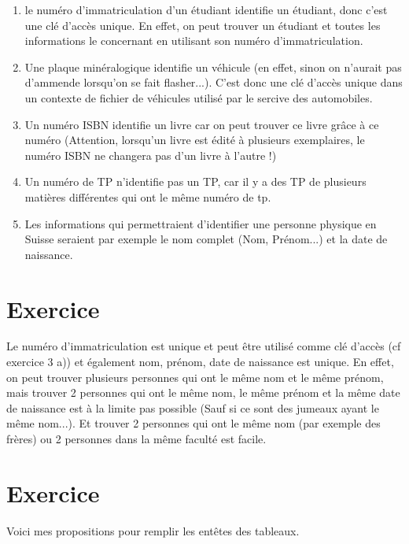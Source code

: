 \documentclass{article}
\begin{document}
\begin{enumerate}
\item le numéro d'immatriculation d'un étudiant identifie un étudiant, donc c'est une clé d'accès unique. En effet, on peut trouver un étudiant et toutes les informations le concernant en utilisant son numéro d'immatriculation.

\item Une plaque minéralogique identifie un véhicule (en effet, sinon on n'aurait pas d'ammende lorsqu'on se fait flasher...). C'est donc une clé d'accès unique dans un contexte de fichier de véhicules utilisé par le sercive des automobiles.

\item Un numéro ISBN identifie un livre car on peut trouver ce livre grâce à ce numéro (Attention, lorsqu'un livre est édité à plusieurs exemplaires, le numéro ISBN ne changera pas d'un livre à l'autre !)

\item Un numéro de TP n'identifie pas un TP, car il y a des TP de plusieurs matières différentes qui ont le même numéro de tp.

\item Les informations qui permettraient d'identifier une personne physique en Suisse seraient par exemple le nom complet (Nom, Prénom...) et la date de naissance.

\end{enumerate}

\section{Exercice}


Le numéro d'immatriculation est unique et peut être utilisé comme clé d'accès (cf exercice 3 a)) et également {nom, prénom, date de naissance} est unique. En effet, on peut trouver plusieurs personnes qui ont le même nom et le même prénom, mais trouver 2 personnes qui ont le même nom, le même prénom et la même date de naissance est à la limite pas possible (Sauf si ce sont des jumeaux ayant le même nom...). Et trouver 2 personnes qui ont le même nom (par exemple des frères) ou 2 personnes dans la même faculté est facile.

\section{Exercice}

Voici mes propositions pour remplir les entêtes des tableaux.
\end{document}
